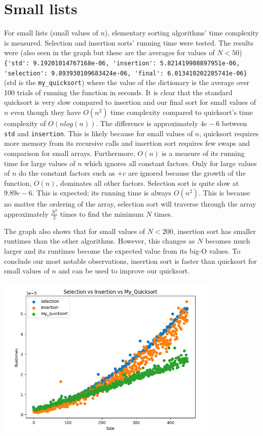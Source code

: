\documentclass{article}
\begin{document}
\section*{Small lists}
For small lists (small values of $n$), elementary sorting algorithms’ time complexity is measured. Selection and insertion sorts’ running time were tested. The results were (also seen in the graph but these are the averages for values of $N < 50$) \verb|{'std': 9.19201014767168e-06, 'insertion': 5.821419908897951e-06,|\break \verb| 'selection': 9.893930109683424e-06, 'final': 6.013410202285741e-06}| (std is the \verb|my_quicksort|) where the value of the dictionary is the average over 100 trials of running the function in seconds. It is clear that the standard quicksort is very slow compared to insertion and our final sort for small values of $n$ even though they have $O(n^2)$ time complexity compared to quicksort’s time complexity of $O(nlog(n))$. The difference is approximately $4e-6$ between \verb|std| and \verb|insertion|. This is likely because for small values of $n$, quicksort requires more memory from its recursive calls and insertion sort requires few swaps and comparison for small arrays. Furthermore, $O(n)$ is a measure of its running time for large values of $n$ which ignores all constant factors. Only for large values of $n$ do the constant factors such as $+c$ are ignored because the growth of the function, $O(n)$, dominates all other factors. Selection sort is quite slow at $9.89e-6$. This is expected; its running time is always $O(n^2)$. This is because no matter the ordering of the array, selection sort will traverse through the array approximately $\frac{N^2}{2}$ times to find the minimum $N$ times. 

The graph also shows that for small values of $N < 200$, insertion sort has smaller runtimes than the other algorithms. However, this changes as $N$ becomes much larger and its runtimes become the expected value from its big-O values. To conclude our most notable observations, insertion sort is faster than quicksort for small values of $n$ and can be used to improve our quicksort.

\includegraphics[width=0.8\textwidth]{elementarySortsComparisons}
\end{document}
